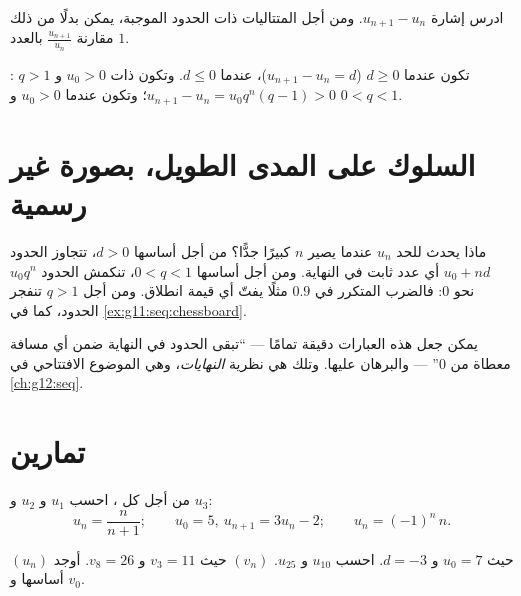 \begin{method}\label{met:g11:seq:monotonicity}
ادرس إشارة $u_{n+1} - u_n$. ومن أجل المتتاليات ذات الحدود الموجبة، يمكن
بدلًا من ذلك مقارنة $\frac{u_{n+1}}{u_n}$ بالعدد $1$.
\end{method}

\begin{example}
تكون   عندما $d \geq 0$
($u_{n+1} - u_n = d$)،  عندما $d \leq 0$. وتكون 
ذات $u_0 > 0$ و $q > 1$ :
$u_{n+1} - u_n = u_0 q^n (q - 1) > 0$؛ وتكون  عندما $u_0 > 0$ و $0 < q < 1$.
\end{example}

\section{السلوك على المدى الطويل، بصورة غير رسمية}

ماذا يحدث للحد $u_n$ عندما يصير $n$ كبيرًا جدًّا؟ من أجل 
أساسها $d > 0$، تتجاوز الحدود $u_0 + nd$ أي عدد ثابت
في النهاية. ومن أجل  أساسها $0 < q < 1$، تنكمش الحدود
$u_0 q^n$ نحو $0$: فالضرب المتكرر في $0.9$ مثلًا يفتّ
أي قيمة انطلاق. ومن أجل $q > 1$ تنفجر الحدود، كما في
\cref{ex:g11:seq:chessboard}.

\begin{remark}
يمكن جعل هذه العبارات دقيقة تمامًا --- ``تبقى الحدود في النهاية
ضمن أي مسافة معطاة من $0$'' --- والبرهان عليها. وتلك هي نظرية
\emph{النهايات}، وهي الموضوع الافتتاحي في \cref{ch:g12:seq}.
\end{remark}

\section{تمارين}

\begin{exercise}[$\star$]\label{exo:g11:seq:1}
من أجل كل ، احسب $u_1$ و $u_2$ و $u_3$:
\[
u_n = \frac{n}{n+1}; \qquad
u_0 = 5,\ u_{n+1} = 3u_n - 2; \qquad
u_n = (-1)^n\,n .
\]
\end{exercise}

\begin{exercise}[$\star$]\label{exo:g11:seq:2}
 $(u_n)$  حيث $u_0 = 7$ و $d = -3$. احسب $u_{10}$ و
$u_{25}$.  $(v_n)$  حيث $v_3 = 11$ و $v_8 = 26$. أوجد
أساسها و $v_0$.
\end{exercise}

